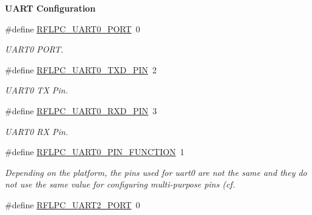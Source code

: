 \begin{Indent}{\bf U\-A\-R\-T Configuration}\par
\begin{DoxyCompactItemize}
\item 
\hypertarget{group__config_ga5cdbffcf41fc063af9cfcb1473c80332}{\#define \hyperlink{group__config_ga5cdbffcf41fc063af9cfcb1473c80332}{R\-F\-L\-P\-C\-\_\-\-U\-A\-R\-T0\-\_\-\-P\-O\-R\-T}~0}\label{group__config_ga5cdbffcf41fc063af9cfcb1473c80332}

\begin{DoxyCompactList}\small\item\em U\-A\-R\-T0 P\-O\-R\-T. \end{DoxyCompactList}\item 
\hypertarget{group__config_gadf8bc56f69f4501e5960ea79ed4f300d}{\#define \hyperlink{group__config_gadf8bc56f69f4501e5960ea79ed4f300d}{R\-F\-L\-P\-C\-\_\-\-U\-A\-R\-T0\-\_\-\-T\-X\-D\-\_\-\-P\-I\-N}~2}\label{group__config_gadf8bc56f69f4501e5960ea79ed4f300d}

\begin{DoxyCompactList}\small\item\em U\-A\-R\-T0 T\-X Pin. \end{DoxyCompactList}\item 
\hypertarget{group__config_ga752305019118b083adfaa2b341912ee4}{\#define \hyperlink{group__config_ga752305019118b083adfaa2b341912ee4}{R\-F\-L\-P\-C\-\_\-\-U\-A\-R\-T0\-\_\-\-R\-X\-D\-\_\-\-P\-I\-N}~3}\label{group__config_ga752305019118b083adfaa2b341912ee4}

\begin{DoxyCompactList}\small\item\em U\-A\-R\-T0 R\-X Pin. \end{DoxyCompactList}\item 
\#define \hyperlink{group__config_ga16df9509883b14d96ddf30f831a0fae5}{R\-F\-L\-P\-C\-\_\-\-U\-A\-R\-T0\-\_\-\-P\-I\-N\-\_\-\-F\-U\-N\-C\-T\-I\-O\-N}~1
\begin{DoxyCompactList}\small\item\em Depending on the platform, the pins used for uart0 are not the same and they do not use the same value for configuring multi-\/purpose pins (cf. \end{DoxyCompactList}\item 
\hypertarget{group__config_gad108f2b9ae2d6aa85bbc58c2e98438df}{\#define \hyperlink{group__config_gad108f2b9ae2d6aa85bbc58c2e98438df}{R\-F\-L\-P\-C\-\_\-\-U\-A\-R\-T2\-\_\-\-P\-O\-R\-T}~0}\label{group__config_gad108f2b9ae2d6aa85bbc58c2e98438df}


\end{DoxyCompactItemize}
\end{Indent}
